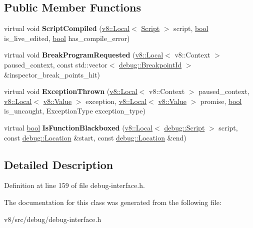 \subsection*{Public Member Functions}
\begin{DoxyCompactItemize}
\item 
\mbox{\label{classv8_1_1debug_1_1DebugDelegate_a364d4f8d4e068a9f52e9ebb4783bd3b5}} 
virtual void {\bfseries Script\+Compiled} (\mbox{\hyperlink{classv8_1_1Local}{v8\+::\+Local}}$<$ \mbox{\hyperlink{classv8_1_1debug_1_1Script}{Script}} $>$ script, \mbox{\hyperlink{classbool}{bool}} is\+\_\+live\+\_\+edited, \mbox{\hyperlink{classbool}{bool}} has\+\_\+compile\+\_\+error)
\item 
\mbox{\label{classv8_1_1debug_1_1DebugDelegate_a9045506c15bd3ed6e52ec722cba9d46b}} 
virtual void {\bfseries Break\+Program\+Requested} (\mbox{\hyperlink{classv8_1_1Local}{v8\+::\+Local}}$<$ v8\+::\+Context $>$ paused\+\_\+context, const std\+::vector$<$ \mbox{\hyperlink{classint}{debug\+::\+Breakpoint\+Id}} $>$ \&inspector\+\_\+break\+\_\+points\+\_\+hit)
\item 
\mbox{\label{classv8_1_1debug_1_1DebugDelegate_a7312aeb0f76638d06ba10d39386fb0f1}} 
virtual void {\bfseries Exception\+Thrown} (\mbox{\hyperlink{classv8_1_1Local}{v8\+::\+Local}}$<$ v8\+::\+Context $>$ paused\+\_\+context, \mbox{\hyperlink{classv8_1_1Local}{v8\+::\+Local}}$<$ \mbox{\hyperlink{classv8_1_1Value}{v8\+::\+Value}} $>$ exception, \mbox{\hyperlink{classv8_1_1Local}{v8\+::\+Local}}$<$ \mbox{\hyperlink{classv8_1_1Value}{v8\+::\+Value}} $>$ promise, \mbox{\hyperlink{classbool}{bool}} is\+\_\+uncaught, Exception\+Type exception\+\_\+type)
\item 
\mbox{\label{classv8_1_1debug_1_1DebugDelegate_aad15be3c7e017374bc3fee156ed272b9}} 
virtual \mbox{\hyperlink{classbool}{bool}} {\bfseries Is\+Function\+Blackboxed} (\mbox{\hyperlink{classv8_1_1Local}{v8\+::\+Local}}$<$ \mbox{\hyperlink{classv8_1_1debug_1_1Script}{debug\+::\+Script}} $>$ script, const \mbox{\hyperlink{classv8_1_1debug_1_1Location}{debug\+::\+Location}} \&start, const \mbox{\hyperlink{classv8_1_1debug_1_1Location}{debug\+::\+Location}} \&end)
\end{DoxyCompactItemize}


\subsection{Detailed Description}


Definition at line 159 of file debug-\/interface.\+h.



The documentation for this class was generated from the following file\+:\begin{DoxyCompactItemize}
\item 
v8/src/debug/debug-\/interface.\+h\end{DoxyCompactItemize}
